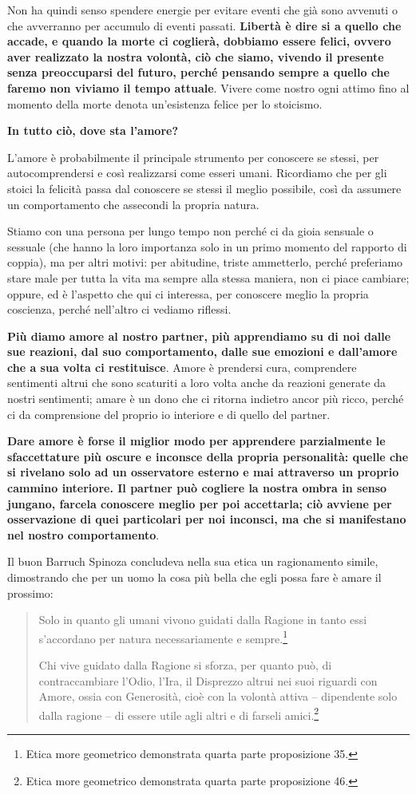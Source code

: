 \documentclass[a4paper,12pt,oneside]{article}%
\begin{document}
Non ha quindi senso spendere energie per evitare eventi che già sono avvenuti o che avverranno per accumulo di eventi passati. \textbf{Libertà è dire si a quello che accade, e quando la morte ci coglierà, dobbiamo essere felici, ovvero aver realizzato la nostra volontà, ciò che siamo, vivendo il presente senza preoccuparsi del futuro, perché pensando sempre a quello che faremo non viviamo il tempo attuale}. Vivere come nostro ogni attimo fino al momento della morte denota un'esistenza felice per lo stoicismo.

\textbf{In tutto ciò, dove sta l'amore?}

L'amore è probabilmente il principale strumento per conoscere se stessi, per autocomprendersi e così realizzarsi come esseri umani. Ricordiamo che per gli stoici la felicità passa dal conoscere se stessi il meglio possibile, così da assumere un comportamento che assecondi la propria natura.

Stiamo con una persona per lungo tempo non perché ci da gioia sensuale o sessuale (che hanno la loro importanza solo in un primo momento del rapporto di coppia), ma per altri motivi: per abitudine, triste ammetterlo, perché preferiamo stare male per tutta la vita ma sempre alla stessa maniera, non ci piace cambiare; oppure, ed è l'aspetto che qui ci interessa, per conoscere meglio la propria coscienza, perché nell'altro ci vediamo riflessi.

\textbf{Più diamo amore al nostro partner, più apprendiamo su di noi dalle sue reazioni, dal suo comportamento, dalle sue emozioni e dall'amore che a sua volta ci restituisce}. Amore è prendersi cura, comprendere sentimenti altrui che sono scaturiti a loro volta anche da reazioni generate da nostri sentimenti; amare è un dono che ci ritorna indietro ancor più ricco, perché ci da comprensione del proprio io interiore e di quello del partner.

\textbf{Dare amore è forse il miglior modo per apprendere parzialmente le sfaccettature più oscure e inconsce della propria personalità: quelle che si rivelano solo ad un osservatore esterno e mai attraverso un proprio cammino interiore. Il partner può cogliere la nostra ombra in senso jungano, farcela conoscere meglio per poi accettarla; ciò avviene per osservazione di quei particolari per noi inconsci, ma che si manifestano nel nostro comportamento}.

Il buon Barruch Spinoza concludeva nella sua etica un ragionamento simile, dimostrando che per un uomo la cosa più bella che egli possa fare è amare il prossimo:

\begin{quotation}
	Solo in quanto gli umani vivono guidati dalla Ragione in
	tanto essi s’accordano per natura necessariamente e sempre.\footnote{Etica more geometrico demonstrata quarta parte proposizione 35.}
	
	Chi vive guidato dalla Ragione si sforza, per quanto può, di
	contraccambiare l’Odio, l’Ira, il Disprezzo altrui nei suoi riguardi con Amore, ossia con Generosità, cioè con la volontà attiva
	– dipendente solo dalla ragione – di essere utile agli altri e di
	farseli amici.\footnote{Etica more geometrico demonstrata quarta parte proposizione 46.}
\end{quotation}
\end{document}
